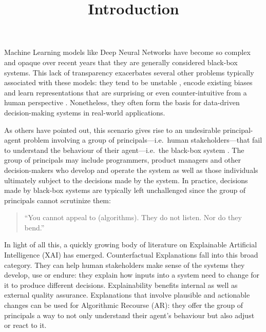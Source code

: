 \documentclass[
  letterpaper,
  DIV=11,
  numbers=noendperiod]{scrartcl}
\title{Introduction}
\author{}
\date{}
\begin{document}
\maketitle
\ifdefined\Shaded\renewenvironment{Shaded}{\begin{tcolorbox}[interior hidden, breakable, borderline west={3pt}{0pt}{shadecolor}, boxrule=0pt, sharp corners, enhanced, frame hidden]}{\end{tcolorbox}}\fi

Machine Learning models like Deep Neural Networks have become so complex
and opaque over recent years that they are generally considered
black-box systems. This lack of transparency exacerbates several other
problems typically associated with these models: they tend to be
unstable \cite{goodfellow2014explaining}, encode existing biases
\cite{buolamwini2018gender} and learn representations that are
surprising or even counter-intuitive from a human perspective
\cite{sturm2014simple}. Nonetheless, they often form the basis for
data-driven decision-making systems in real-world applications.

As others have pointed out, this scenario gives rise to an undesirable
principal-agent problem involving a group of principals---i.e.~human
stakeholders---that fail to understand the behaviour of their
agent---i.e.~the black-box system \cite{borch2022machine}. The group of
principals may include programmers, product managers and other
decision-makers who develop and operate the system as well as those
individuals ultimately subject to the decisions made by the system. In
practice, decisions made by black-box systems are typically left
unchallenged since the group of principals cannot scrutinize them:

\begin{quote}
``You cannot appeal to (algorithms). They do not listen. Nor do they
bend.'' \cite{oneil2016weapons}
\end{quote}

In light of all this, a quickly growing body of literature on
Explainable Artificial Intelligence (XAI) has emerged. Counterfactual
Explanations fall into this broad category. They can help human
stakeholders make sense of the systems they develop, use or endure: they
explain how inputs into a system need to change for it to produce
different decisions. Explainability benefits internal as well as
external quality assurance. Explanations that involve plausible and
actionable changes can be used for Algorithmic Recourse (AR): they offer
the group of principals a way to not only understand their agent's
behaviour but also adjust or react to it.
\end{document}
